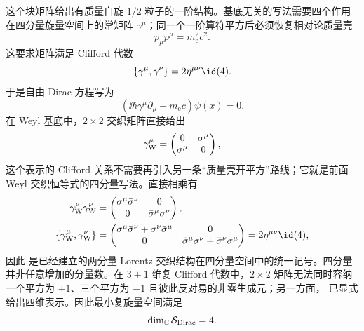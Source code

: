 这个块矩阵给出有质量自旋 $1/2$ 粒子的一阶结构。基底无关的写法需要四个作用在四分量旋量空间上的常矩阵 $\gamma^\mu$；同一个一阶算符平方后必须恢复相对论质量壳
\begin{equation}
 p_\mu p^\mu=m_{\mathrm e}^2c^2.
 \label{eq:mass-shell}
\end{equation}
这要求矩阵满足 Clifford 代数
\begin{equation}
 {\{\gamma^\mu,\gamma^\nu\}=2\eta^{\mu\nu}\id(4).}
 \label{eq:clifford-general}\end{equation}
于是自由 Dirac 方程写为
\begin{equation}
 {
 \left(\ii\hbar\gamma^\mu\partial_\mu-m_{\mathrm e} c\right)\psi(x)=0.}
 \label{eq:general-first-order}
\end{equation}
在 Weyl 基底中，$2\times2$ 交织矩阵直接给出
\begin{equation}
 {
 \gamma^\mu_{\rm W}=
 \begin{pmatrix}
 0&\sigma^\mu\\
 \bar\sigma^\mu&0
 \end{pmatrix},}
 \label{eq:weyl-gamma}
\end{equation}
这个表示的 Clifford 关系不需要再引入另一条“质量壳开平方”路线；它就是前面 Weyl 交织恒等式的四分量写法。直接相乘有
\begin{align*}
 \gamma^\mu_{\rm W}\gamma^\nu_{\rm W}
 &=\begin{pmatrix}
 \sigma^\mu\bar\sigma^\nu&0\\
 0&\bar\sigma^\mu\sigma^\nu
 \end{pmatrix},\\
 \{\gamma^\mu_{\rm W},\gamma^\nu_{\rm W}\}
 &=\begin{pmatrix}
 \sigma^\mu\bar\sigma^\nu+\sigma^\nu\bar\sigma^\mu&0\\
 0&\bar\sigma^\mu\sigma^\nu+\bar\sigma^\nu\sigma^\mu
 \end{pmatrix}
 =2\eta^{\mu\nu}\id(4),
\end{align*}
因此 是已经建立的两分量 Lorentz 交织结构在四分量空间中的统一记号。四分量并非任意增加的分量数。在 $3+1$ 维复 Clifford 代数中，$2\times2$ 矩阵无法同时容纳一个平方为 $+1$、三个平方为 $-1$ 且彼此反对易的非零生成元；另一方面， 已显式给出四维表示。因此最小复旋量空间满足
\begin{equation}
 {\dim_{\mathbb C}\mathcal S_{\rm Dirac}=4.}
 \label{eq:dirac-minimal-spinor-dimension-dp68}
\end{equation}

